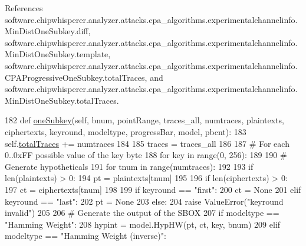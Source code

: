 References software.\+chipwhisperer.\+analyzer.\+attacks.\+cpa\+\_\+algorithms.\+experimentalchannelinfo.\+Min\+Dist\+One\+Subkey.\+diff, software.\+chipwhisperer.\+analyzer.\+attacks.\+cpa\+\_\+algorithms.\+experimentalchannelinfo.\+Min\+Dist\+One\+Subkey.\+template, software.\+chipwhisperer.\+analyzer.\+attacks.\+cpa\+\_\+algorithms.\+experimentalchannelinfo.\+C\+P\+A\+Progressive\+One\+Subkey.\+total\+Traces, and software.\+chipwhisperer.\+analyzer.\+attacks.\+cpa\+\_\+algorithms.\+experimentalchannelinfo.\+Min\+Dist\+One\+Subkey.\+total\+Traces.


\begin{DoxyCode}
182     \textcolor{keyword}{def }\hyperlink{classsoftware_1_1chipwhisperer_1_1analyzer_1_1attacks_1_1cpa__algorithms_1_1experimentalchannelinfo_1_1MinDistOneSubkey_ac37dae9e838fb5532a7f18be3c7fcfaf}{oneSubkey}(self, bnum, pointRange, traces\_all, numtraces, plaintexts, ciphertexts, 
      keyround, modeltype, progressBar, model, pbcnt):
183         self.\hyperlink{classsoftware_1_1chipwhisperer_1_1analyzer_1_1attacks_1_1cpa__algorithms_1_1experimentalchannelinfo_1_1MinDistOneSubkey_abbc316bb21caa52a556a2bf1b7c82eca}{totalTraces} += numtraces
184 
185         traces = traces\_all
186 
187         \textcolor{comment}{# For each 0..0xFF possible value of the key byte}
188         \textcolor{keywordflow}{for} key \textcolor{keywordflow}{in} range(0, 256):
189 
190             \textcolor{comment}{# Generate hypotheticals}
191             \textcolor{keywordflow}{for} tnum \textcolor{keywordflow}{in} range(numtraces):
192 
193                 \textcolor{keywordflow}{if} len(plaintexts) > 0:
194                     pt = plaintexts[tnum]
195 
196                 \textcolor{keywordflow}{if} len(ciphertexts) > 0:
197                     ct = ciphertexts[tnum]
198 
199                 \textcolor{keywordflow}{if} keyround == \textcolor{stringliteral}{"first"}:
200                     ct = \textcolor{keywordtype}{None}
201                 \textcolor{keywordflow}{elif} keyround == \textcolor{stringliteral}{"last"}:
202                     pt = \textcolor{keywordtype}{None}
203                 \textcolor{keywordflow}{else}:
204                     \textcolor{keywordflow}{raise} ValueError(\textcolor{stringliteral}{"keyround invalid"})
205 
206                 \textcolor{comment}{# Generate the output of the SBOX}
207                 \textcolor{keywordflow}{if} modeltype == \textcolor{stringliteral}{"Hamming Weight"}:
208                     hypint = model.HypHW(pt, ct, key, bnum)
209                 \textcolor{keywordflow}{elif} modeltype == \textcolor{stringliteral}{"Hamming Weight (inverse)"}:

\end{DoxyCode}

